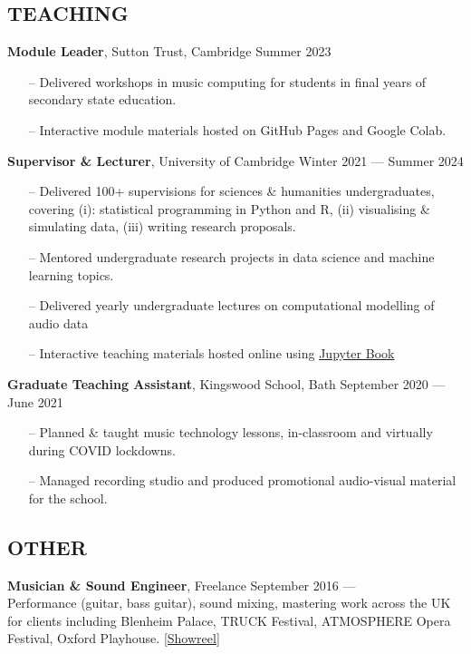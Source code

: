 \documentclass[11pt]{stylesheet} %
\begin{document}
\begin{resume}
\subsection{TEACHING}\vspace{-8pt}
\textbf{Module Leader}, Sutton Trust, Cambridge \hfill Summer 2023
\begin{itemize}[leftmargin=*]
	\setlength\itemsep{0pt}
		\item[--]Delivered workshops in music computing for students in final years of secondary state education. 
		\item[--]Interactive module materials hosted on GitHub Pages and Google Colab.
\end{itemize}
\textbf{Supervisor \& Lecturer}, University of Cambridge \hfill Winter 2021 --- Summer 2024
\begin{itemize}[leftmargin=*]
	\setlength\itemsep{0pt}
		\item[--]Delivered 100+ supervisions for sciences \& humanities undergraduates, covering (i): statistical programming in Python and \textsf{R}, (ii) visualising \& simulating data, (iii) writing research proposals.
		\item[--]Mentored undergraduate research projects in data science and machine learning topics.
		\item[--]Delivered yearly undergraduate lectures on computational modelling of audio data
		\item[--]Interactive teaching materials hosted online using \href{https://huwcheston.github.io/PS-Supervision/intro.html}{Jupyter Book}
\end{itemize}
\textbf{Graduate Teaching Assistant}, Kingswood School, Bath \hfill September 2020 --- June 2021
\begin{itemize}[leftmargin=*]
	\setlength\itemsep{0pt}
		\item[--]Planned \& taught music technology lessons, in-classroom and virtually during COVID lockdowns.
		\item[--]Managed recording studio and produced promotional audio-visual material for the school.
\end{itemize}\vspace{-16pt}
\subsection{OTHER}\vspace{-8pt}
\textbf{Musician \& Sound Engineer}, Freelance \hfill September 2016 --- \\
Performance (guitar, bass guitar), sound mixing, mastering work across the UK for clients including Blenheim Palace, TRUCK Festival, ATMOSPHERE Opera Festival, Oxford Playhouse. \href{https://www.youtube.com/watch?v=2ccWNviTf4A&ab_channel=HuwCheston}{[Showreel]} \hfill 


\end{resume}
\end{document}
